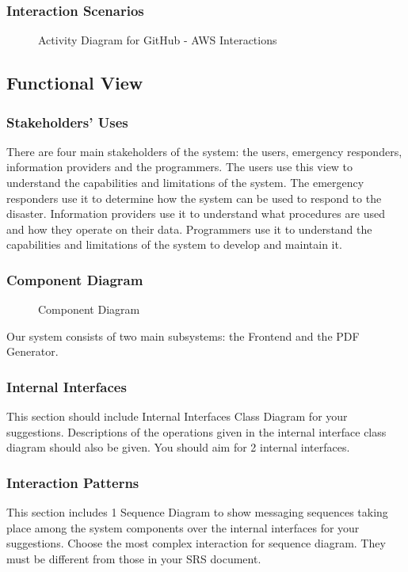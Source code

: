 \documentclass[a4paper]{article}
\begin{document}
    \subsubsection{Interaction Scenarios}
    \begin{figure}
        
        \caption{Activity Diagram for GitHub - AWS Interactions}
    \end{figure}
    
    \subsection{Functional View}
    \subsubsection{Stakeholders' Uses}
    There are four main stakeholders of the system: the users, emergency responders, information providers and the programmers.
    The users use this view to understand the capabilities and limitations of the system. The emergency responders use it to
    determine how the system can be used to respond to the disaster. Information providers use it to understand what procedures
    are used and how they operate on their data. Programmers use it to understand the capabilities and limitations of the system
    to develop and maintain it.
    \subsubsection{Component Diagram}
    \begin{figure}
        
        \caption{Component Diagram}
    \end{figure}

    Our system consists of two main subsystems: the Frontend and the PDF Generator.

    \subsubsection{Internal Interfaces}
    This section should include Internal Interfaces Class Diagram for your
    suggestions. Descriptions of the operations given in the internal interface class
    diagram should also be given. You should aim for 2 internal interfaces.
    \subsubsection{Interaction Patterns}
    This section includes 1 Sequence Diagram to show messaging sequences taking
    place among the system components over the internal interfaces for your
    suggestions. Choose the most complex interaction for sequence diagram. They
    must be different from those in your SRS document.
\end{document}
